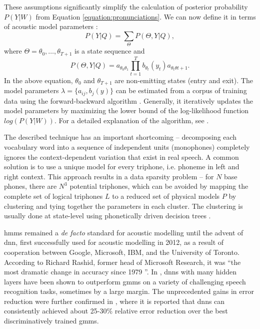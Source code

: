 These assumptions significantly simplify the calculation of posterior probability $P(Y|W)$ from Equation \ref{equation:pronunciations}. We can now define it in terms of acoustic model parameters \cite{lu2013subspace}:
\begin{equation}
  P(Y|Q)=\sum_{\Theta}P(\Theta, Y|Q),
\end{equation}
where $\Theta=\theta_{0}, \ldots, \theta_{T+1}$ is a state sequence and
\begin{equation}
  \label{equation:states}
  P(\Theta, Y|Q)=a_{\theta_{0}\theta_{1}}\prod_{t=1}^{T}b_{\theta_{t}}(y_{t})a_{\theta_{t}\theta{t+1}}.
\end{equation}
In the above equation, $\theta_{0}$ and $\theta_{T+1}$ are non-emitting states (entry and exit). The model parameters $\lambda=\{a_{ij}, b_{j}(y)\}$ can be estimated from a corpus of training data using the forward-backward algorithm \cite{baum1970maximization}. Generally, it iteratively updates the model parameters by maximizing the lower bound of the log-likelihood function $log(P(Y|W))$. For a detailed explanation of the algorithm, see \cite{rabiner1986introduction}.

The described technique has an important shortcoming -- decomposing each vocabulary word into a sequence of independent units (monophones) completely ignores the context-dependent variation that exist in real speech. A common solution is to use a unique model for every triphone, i.e. phoneme in left and right context. This approach results in a data sparsity problem -- for $N$ base phones, there are $N^{3}$ potential triphones, which can be avoided by mapping the complete set of logical triphones $L$ to a reduced set of physical models $P$ by clustering and tying together the parameters in each cluster. The clustering is usually done at state-level using phonetically driven decision trees \cite{gales2008application}.

\Glspl{hmm} remained a \textit{de facto} standard for acoustic modelling until the advent of \gls{dnn}, first successfully used for acoustic modelling in 2012, as a result of cooperation between Google, Microsoft, IBM, and the University of Toronto. According to Richard Rashid, former head of Microsoft Research, it was ``the most dramatic change in accuracy since 1979 \cite{markoff2012scientists}''. In \cite{hinton2012deep}, \glspl{dnn} with many hidden layers have been shown to outperform \glspl{gmm} on a variety of challenging speech recognition tasks, sometimes by a large margin. The unprecedented gains in error reduction were further confirmed in \cite{pan2012investigation}, where it is reported that \glspl{dnn} can consistently achieved about 25-30\% relative error reduction over the best discriminatively trained \glspl{gmm}.

